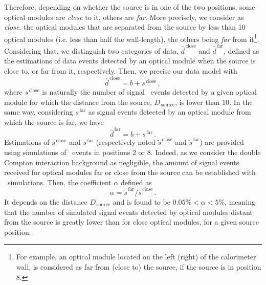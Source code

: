 Therefore, depending on whether the source is in one of the two positions, some optical modules are \emph{close} to it, others are \emph{far}.
More precisely, we consider as \emph{close}, the optical modules that are separated from the source by less than 10 optical modules (i.e. less than half the wall-length), the others being \emph{far} from it\footnote{For example, an optical module located on the left (right) of the calorimeter wall, is considered as far from (close to) the source, if the source is in position $8$.}.
Considering that, we distinguish two categories of data, $\hat{d}^{\,\text{close}}$ and $\hat{d}^{\,\text{far}}$, defined as the estimations of data events detected by an optical module when the source is close to, or far from it, respectively.
Then, we precise our data model with
\begin{equation}
  \hat{d}^{\,\text{close}} = b + s^{\,\text{close}}\,,
  \label{eq:estimation_data_close}
\end{equation}
where $s^{\,\text{close}}$ is naturally the number of signal \Co\ events detected by a given optical module for which the distance from the source, $D_{\,\text{source}}$, is lower than $10$.
In the same way, considering $s^{\,\text{far}}$ as signal events detected by an optical module from which the source is far, we have
\begin{equation}
  \hat{d}^{\,\text{far}} = b + s^{\,\text{far}}\,.
  \label{eq:estimation_data_far}
\end{equation}
Estimations of $s^{\,\text{close}}$ and $s^{\,\text{far}}$ (respectively noted $\tilde{s}^{\,\text{close}}$ and $\tilde{s}^{\,\text{far}}$) are provided using simulations of \Co\ events in positions $2$ or $8$.
Indeed, as we consider the double Compton interaction background as negligible, the amount of signal events received for optical modules far or close from the source can be established with \Co\ simulations.
Then, the coefficient $\alpha$ defined as
\begin{equation}
  \alpha = \tilde{s}^{\,\text{far}}/\tilde{s}^{\,\text{close}}\,.
\end{equation}
It depends on the distance $D_{\,\text{source}}$ and is found to be $0.05 \% < \alpha < 5 \%$, meaning that the number of simulated signal events detected by optical modules distant from the source is greatly lower than for close optical modules, for a given source position.

